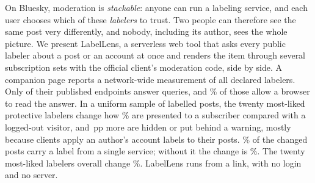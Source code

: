 On Bluesky, moderation is \emph{stackable}: anyone can run a labeling service, and each user chooses which of these \emph{labelers} to trust. Two people can therefore see the same post very differently, and nobody, including its author, sees the whole picture. We present LabelLens, a serverless web tool that asks every public labeler about a post or an account at once and renders the item through several subscription sets with the official client's moderation code, side by side. A companion page reports a network-wide measurement of all \labDeclared declared labelers. Only \labAnswering of their \labEndpoint published endpoints answer queries, and \labBrowserPctOfAnswering\% of those allow a browser to read the answer. In a uniform sample of labelled posts, the twenty most-liked protective labelers change how \lensPostProtDiffPct\% are presented to a subscriber compared with a logged-out visitor, and \lensPostProtHardDiffPct\,pp more are hidden or put behind a warning, mostly because clients apply an author's account labels to their posts. \lensTopDriverPct\% of the changed posts carry a label from a single service; without it the change is \lensPostProtNoTopDiffPct\%. The twenty most-liked labelers overall change \lensPostPopDiffPct\%. LabelLens runs from a link, with no login and no server.
